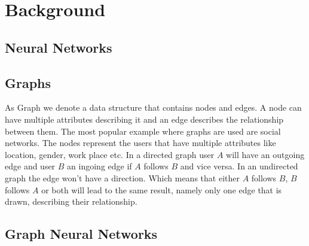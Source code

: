\chapter{Background}

  \section{Neural Networks}

	\section{Graphs}

		As Graph we denote a data structure that contains nodes and edges. A node can have multiple attributes describing it and an edge describes the relationship between them. The most popular example where graphs are used are social networks. The nodes represent the users that have multiple attributes like location, gender, work place etc. In a directed graph user $A$ will have an outgoing edge and user $B$ an ingoing edge if $A$ follows $B$ and vice versa. In an undirected graph the edge won't have a direction. Which means that either $A$ follows $B$, $B$ follows $A$ or both will lead to the same result, namely only one edge that is drawn, describing their relationship.

	\section{Graph Neural Networks}

